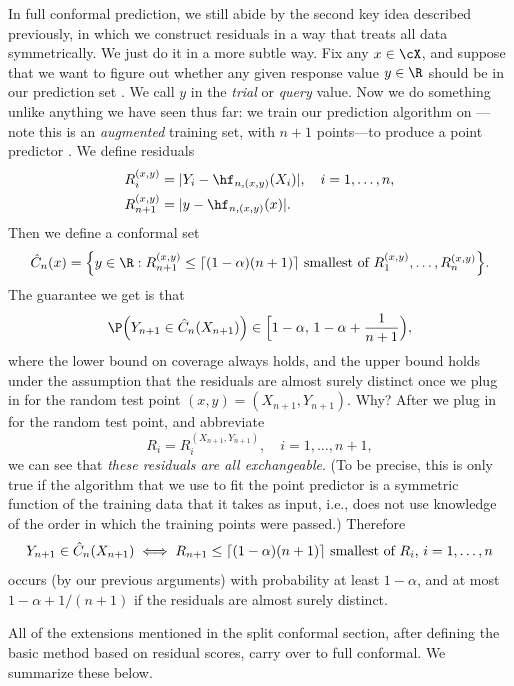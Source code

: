 \documentclass{article}
\begin{document}
In full conformal prediction, we still abide by the second key idea described
previously, in which we construct residuals in a way that treats all data
symmetrically. We just do it in a more subtle way. Fix any $x \in \cX$, and
suppose that we want to figure out whether any given response value $y \in \R$
should be in our prediction set . We call $y$ in the
\emph{trial} or \emph{query} value.  Now we do something unlike anything we have
seen thus far: we train our prediction algorithm on
---note this is an \emph{augmented}  
training set, with $n+1$ points---to produce a point predictor
. We define residuals  
\begin{align*}
R_i^{(x,y)} &= |Y_i-\hf_{n,(x,y)}(X_i)|, \quad i=1,\dots,n, \\
R_{n+1}^{(x,y)} &= |y-\hf_{n,(x,y)}(x)|.
\end{align*}
Then we define a conformal set
\begin{equation}
\label{eq:cset_full}
\hC_n(x) = \Big\{ y \in \R : R_{n+1}^{(x,y)} \leq \text{$\lceil (1-\alpha)(n+1) 
  \rceil$ smallest of $R_1^{(x,y)}, \dots, R_n^{(x,y)}$} \Big\}.
\end{equation}
The guarantee we get is that 
\begin{equation}
\label{eq:coverage_full}
\P\Big( Y_{n+1} \in \hC_n(X_{n+1}) \Big) \in \Big[ 1-\alpha, \, 1-\alpha +
\frac{1}{n+1} \Big),
\end{equation}
where the lower bound on coverage always holds, and the upper bound holds under
the assumption that the residuals are almost surely distinct once we plug in
for the random test point $(x,y) = (X_{n+1},Y_{n+1})$. Why? After we plug in for
the random test point, and abbreviate
\[
R_i = R_i^{(X_{n+1},Y_{n+1})}, \quad i=1,\dots,n+1,
\]
we can see that \emph{these residuals are all exchangeable}. (To be precise,
this is only true if the algorithm that we use to fit the point predictor
 is a symmetric function of the training data that it
takes as input, i.e., does not use knowledge of the order in which the training
points were passed.) Therefore
\[
Y_{n+1} \in \hat{C}_n(X_{n+1}) 
\iff \text{$R_{n+1} \leq \lceil (1-\alpha)(n+1) \rceil$ smallest of $R_i$,
  $i=1,\dots,n$}
\]
occurs (by our previous arguments) with probability at least $1-\alpha$, and at
most $1-\alpha+1/(n+1)$ if the residuals are almost surely distinct.

All of the extensions mentioned in the split conformal section, after defining
the basic method based on residual scores, carry over to full conformal. We
summarize these below.
\end{document}
